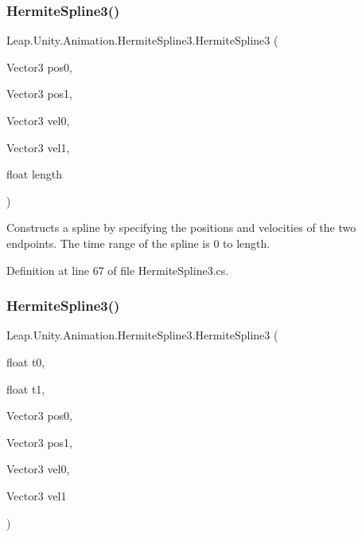 \mbox{\label{struct_leap_1_1_unity_1_1_animation_1_1_hermite_spline3_a8f97bb168dab46f340fd39d2f119582f}} 
\subsubsection{\texorpdfstring{HermiteSpline3()}{HermiteSpline3()}\hspace{0.1cm}{\footnotesize\ttfamily [3/4]}}
{\footnotesize\ttfamily Leap.\+Unity.\+Animation.\+Hermite\+Spline3.\+Hermite\+Spline3 (\begin{DoxyParamCaption}\item[{Vector3}]{pos0,  }\item[{Vector3}]{pos1,  }\item[{Vector3}]{vel0,  }\item[{Vector3}]{vel1,  }\item[{float}]{length }\end{DoxyParamCaption})}



Constructs a spline by specifying the positions and velocities of the two endpoints. The time range of the spline is 0 to length. 



Definition at line 67 of file Hermite\+Spline3.\+cs.

\mbox{\label{struct_leap_1_1_unity_1_1_animation_1_1_hermite_spline3_aff3a894b67f3fbd0750eab21e2d0897e}} 
\subsubsection{\texorpdfstring{HermiteSpline3()}{HermiteSpline3()}\hspace{0.1cm}{\footnotesize\ttfamily [4/4]}}
{\footnotesize\ttfamily Leap.\+Unity.\+Animation.\+Hermite\+Spline3.\+Hermite\+Spline3 (\begin{DoxyParamCaption}\item[{float}]{t0,  }\item[{float}]{t1,  }\item[{Vector3}]{pos0,  }\item[{Vector3}]{pos1,  }\item[{Vector3}]{vel0,  }\item[{Vector3}]{vel1 }\end{DoxyParamCaption})}



